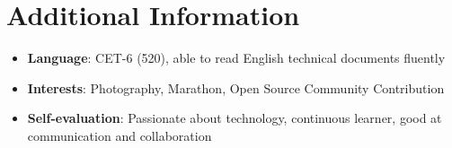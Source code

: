 \documentclass[11pt,a4paper]{article}
\begin{document}
\section*{\faInfoCircle\quad Additional Information}

\begin{itemize}
    \item \textbf{Language}: CET-6 (520), able to read English technical documents fluently
    \item \textbf{Interests}: Photography, Marathon, Open Source Community Contribution
    \item \textbf{Self-evaluation}: Passionate about technology, continuous learner, good at communication and collaboration
\end{itemize}
\end{document}
